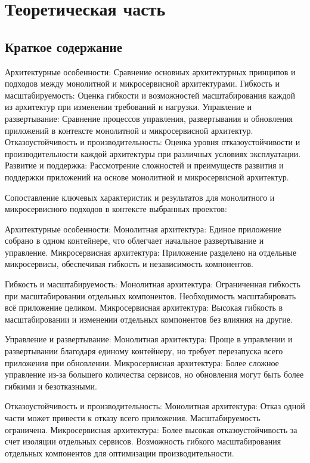 \section{Теоретическая часть}

\subsection{Краткое содержание}
    Архитектурные особенности: Сравнение основных архитектурных принципов и подходов между монолитной и микросервисной архитектурами.
    Гибкость и масштабируемость: Оценка гибкости и возможностей масштабирования каждой из архитектур при изменении требований и нагрузки.
    Управление и развертывание: Сравнение процессов управления, развертывания и обновления приложений в контексте монолитной и микросервисной архитектур.
    Отказоустойчивость и производительность: Оценка уровня отказоустойчивости и производительности каждой архитектуры при различных условиях эксплуатации.
    Развитие и поддержка: Рассмотрение сложностей и преимуществ развития и поддержки приложений на основе монолитной и микросервисной архитектур.

    Сопоставление ключевых характеристик и результатов для монолитного и микросервисного подходов в контексте выбранных проектов:

    Архитектурные особенности:
        Монолитная архитектура: Единое приложение собрано в одном контейнере, что облегчает начальное развертывание и управление.
        Микросервисная архитектура: Приложение разделено на отдельные микросервисы, обеспечивая гибкость и независимость компонентов.

    Гибкость и масштабируемость:
        Монолитная архитектура: Ограниченная гибкость при масштабировании отдельных компонентов. Необходимость масштабировать всё приложение целиком.
        Микросервисная архитектура: Высокая гибкость в масштабировании и изменении отдельных компонентов без влияния на другие.

    Управление и развертывание:
        Монолитная архитектура: Проще в управлении и развертывании благодаря единому контейнеру, но требует перезапуска всего приложения при обновлении.
        Микросервисная архитектура: Более сложное управление из-за большего количества сервисов, но обновления могут быть более гибкими и безотказными.

    Отказоустойчивость и производительность:
        Монолитная архитектура: Отказ одной части может привести к отказу всего приложения. Масштабируемость ограничена.
        Микросервисная архитектура: Более высокая отказоустойчивость за счет изоляции отдельных сервисов. Возможность гибкого масштабирования отдельных компонентов для оптимизации производительности.

